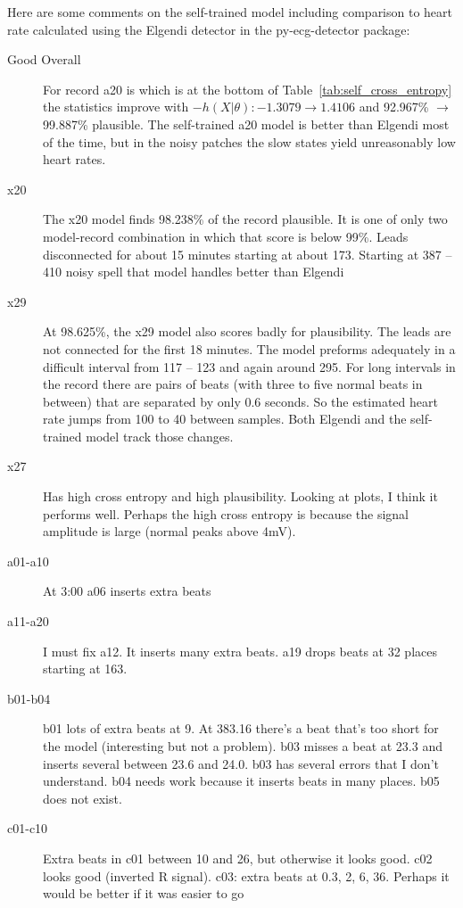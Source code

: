\documentclass[12pt]{article}
\begin{document}
Here are some comments on the self-trained model including comparison
to heart rate calculated using the Elgendi detector in the
py-ecg-detector package:
\begin{description}
\item[Good Overall] For record a20 is which is at the bottom of
  Table~\ref{tab:self_cross_entropy} the statistics improve with
  $-h(X|\theta): -1.3079 \rightarrow 1.4106$ and 92.967\% $\rightarrow$
  99.887\% plausible.  The self-trained a20 model is better than Elgendi
  most of the time, but in the noisy patches the slow states yield
  unreasonably low heart rates.
\item[x20] The x20 model finds 98.238\% of the record plausible.  It
  is one of only two model-record combination in which that score is
  below 99\%.  Leads disconnected for about 15 minutes starting at
  about 173.  Starting at 387 -- 410 noisy spell that model handles
  better than Elgendi
\item[x29] At 98.625\%, the x29 model also scores badly for
  plausibility.  The leads are not connected for the first 18 minutes.
  The model preforms adequately in a difficult interval from 117 --
  123 and again around 295.  For long intervals in the record there
  are pairs of beats (with three to five normal beats in between) that
  are separated by only 0.6 seconds.  So the estimated heart rate
  jumps from 100 to 40 between samples.  Both Elgendi and the
  self-trained model track those changes.
\item[x27] Has high cross entropy and high plausibility.  Looking at
  plots, I think it performs well.  Perhaps the high cross entropy is
  because the signal amplitude is large (normal peaks above 4mV).
\item[a01-a10] At 3:00 a06 inserts extra beats
\item[a11-a20] I must fix a12.  It inserts many extra beats.  a19
  drops beats at 32 places starting at 163.
\item[b01-b04] b01 lots of extra beats at 9.  At 383.16 there's a beat
  that's too short for the model (interesting but not a problem).  b03
  misses a beat at 23.3 and inserts several between 23.6 and 24.0.
  b03 has several errors that I don't understand.  b04 needs work
  because it inserts beats in many places.  b05 does not exist.
\item[c01-c10] Extra beats in c01 between 10 and 26, but otherwise it
  looks good.  c02 looks good (inverted R signal).  c03: extra beats
  at 0.3, 2, 6, 36.  Perhaps it would be better if it was easier to go

\end{description}
\end{document}
